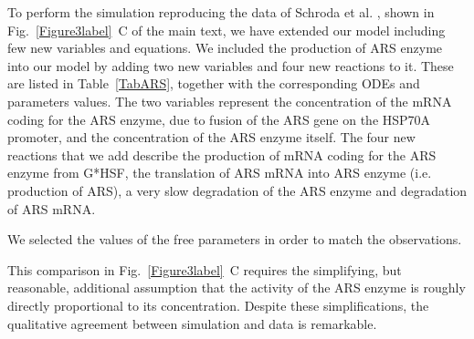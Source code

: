 \documentclass[oneside, 10pt, a4paper, twocolumn]{article}
\begin{document}
To perform the simulation reproducing the data of Schroda et al. \cite{Schroda2000}, shown in Fig.~\ref{Figure3label}~C of the main text, we have extended our model including few new variables and equations. 
We included the production of ARS enzyme into our model by adding two new variables and four new reactions to it. 
These are listed in Table~\ref{TabARS}, together with the corresponding ODEs and parameters values.
The two variables represent the concentration of the mRNA coding for the ARS enzyme, due to fusion of the ARS gene on the HSP70A promoter, and the concentration of the ARS enzyme itself.
The four new reactions that we add describe the production of mRNA coding for the ARS enzyme from G*HSF, the translation of ARS mRNA into ARS enzyme (i.e. production of ARS), a very slow degradation of the ARS enzyme and degradation of ARS mRNA.


We selected the values of the free parameters in order to match the observations. 

This comparison in Fig.~\ref{Figure3label}~C requires the simplifying, but  reasonable, additional assumption that the activity of the ARS enzyme is roughly directly proportional to its concentration. 
Despite these simplifications, the qualitative agreement between simulation and data is remarkable. 
\end{document}
